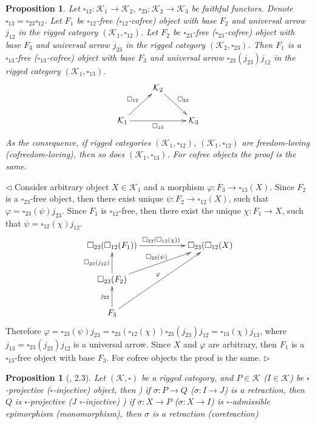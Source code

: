 \documentclass[12pt]{article}
\newtheorem{proposition}[theorem]{Proposition}
\newenvironment{proof}{\par $\triangleleft$}{$\triangleright$}
\begin{document}
\begin{proposition}\label{PrCompOfFrIsFr} 
Let $\square_{12}:\mathcal{K}_1\to\mathcal{K}_2$, $\square_{23}:\mathcal{K}_2\to\mathcal{K}_3$ be faithful functors. Denote $\square_{13}=\square_{23}\square_{12}$. Let 
$F_1$ be $\square_{12}$-free ($\square_{12}$-cofree) object with base $F_2$ and universal arrow $j_{12}$ in the rigged category $(\mathcal{K}_1,\square_{12})$. Let $F_2$ be $\square_{23}$-free 
($\square_{23}$-cofree) object with base $F_3$ and universal arrow $j_{23}$ in the rigged category $(\mathcal{K}_2,\square_{23})$. Then $F_1$ is a $\square_{13}$-free ($\square_{13}$-cofree) 
object with base $F_3$ and universal arrow $\square_{23}(j_{23})j_{12}$ in the rigged category $(\mathcal{K}_1,\square_{13})$. 
$$
\xymatrix{
& { \mathcal{K}_2} \ar[dr]^{\square_{23}} & \\
{\mathcal{K}_1} \ar[ur]^{\square_{12}} \ar[rr]_{\square_{13}} & & {\mathcal{K}_3}}
$$
As the consequence, if rigged categories $(\mathcal{K}_1,\square_{12})$, $(\mathcal{K}_1,\square_{12})$ are freedom-loving (cofreedom-loving), then so does $(\mathcal{K}_1,\square_{13})$. For cofree objects the proof is the same.
\end{proposition}
\begin{proof}
Consider arbitrary object $X\in\mathcal{K}_1$ and a morphism $\varphi:F_3\to \square_{13}(X)$. Since $F_2$ is a $\square_{23}$-free object, then there exist unique $\psi:F_2\to \square_{12}(X)$, 
such that $\varphi=\square_{23}(\psi)j_{23}$. Since $F_1$ is $\square_{12}$-free, then there exist the unique $\chi:F_1\to X$, such that $\psi=\square_{12}(\chi)j_{12}$.
$$
\xymatrix
{
{\square_{23}(\square_{12}(F_1)}) \ar[rr]^{\square_{23}(\square_{12}(\chi))}& & {\square_{23}(\square_{12}(X)}\\
{\square_{23}(F_2)} \ar[u]^{\square_{23}(j_{12})} \ar[urr]^{\square_{23}(\psi)} & &\\
{F_3} \ar[u]^{j_{23}} \ar[uurr]^{\varphi} & \\
} 
$$
Therefore $\varphi=\square_{23}(\psi)j_{23}=\square_{23}(\square_{12}(\chi))\square_{23}(j_{23})j_{12}=\square_{13}(\chi) j_{13}$, where $j_{13}=\square_{23}(j_{23})j_{12}$ is a universal arrow. 
Since $X$ and $\varphi$ are arbitrary, then $F_1$ is a $\square_{13}$-free object with base $F_3$. For cofree objects the proof is the same.
\end{proof}

\begin{proposition}[\cite{HelMetrFrQmod}, 2.3]\label{PrRetractsProjInj} Let $(\mathcal{K},\square)$ be a rigged category, and $P\in\mathcal{K}$ ($I\in\mathcal{K}$) be 
$\square$-projective ($\square$-injective) object, then
) if $\sigma:P\to Q$ ($\sigma:I\to J$) is a retraction, then $Q$ is $\square$-projective ($J$ $\square$-injective)
) if $\sigma:X\to P$ ($\sigma:X\to I$) is $\square$-admissible epimorphism (monomorphism), then $\sigma$ is a retraction (coretraction)
\end{proposition}
\end{document}
